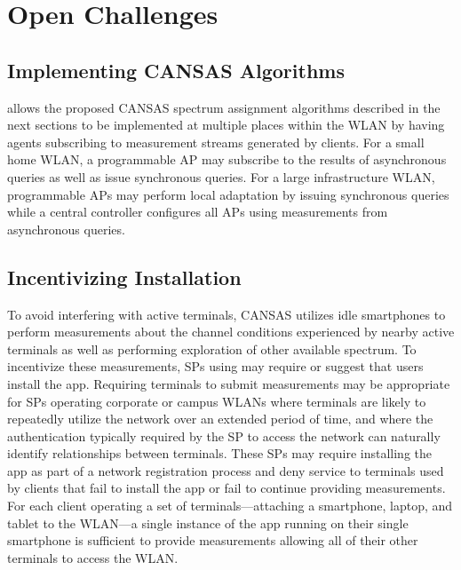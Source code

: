 \section{Open Challenges}
\label{sec-challenges}

\subsection{Implementing CANSAS Algorithms}

\PS{} allows the proposed CANSAS spectrum assignment algorithms
described in the next sections to be implemented at multiple places within
the WLAN by having agents subscribing to measurement streams generated by
\PS{} clients. For a small home WLAN, a programmable AP may subscribe
to the results of asynchronous queries as well as issue synchronous queries.
For a large infrastructure WLAN, programmable APs may perform local
adaptation by issuing synchronous queries while a central controller
configures all APs using measurements from asynchronous queries.


\subsection{Incentivizing Installation}

To avoid interfering with active terminals, CANSAS utilizes idle smartphones
to perform measurements about the channel conditions experienced by nearby
active terminals as well as performing exploration of other available
spectrum. To incentivize these measurements, SPs using \PS{} may
require or suggest that users install the \PS{} app. Requiring
terminals to submit measurements may be appropriate for SPs operating
corporate or campus WLANs where terminals are likely to repeatedly utilize
the network over an extended period of time, and where the authentication
typically required by the SP to access the network can naturally identify
relationships between terminals. These SPs may require installing the
\PS{} app as part of a network registration process and deny service
to terminals used by clients that fail to install the app or fail to continue
providing measurements. For each client operating a set of
terminals---attaching a smartphone, laptop, and tablet to the \PS{}
WLAN---a single instance of the \PS{} app running on their single
smartphone is sufficient to provide measurements allowing all of their other
terminals to access the WLAN.

